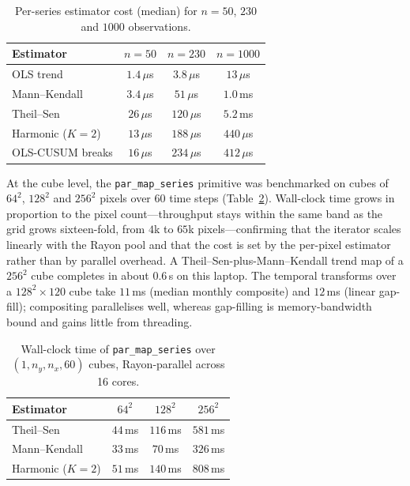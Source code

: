 \documentclass[review]{elsarticle}
\begin{document}
\begin{table}[t]
\centering
\caption{Per-series estimator cost (median) for $n = 50$, $230$ and $1000$
observations.}
\label{tab:perseries}
\small
\begin{tabular}{@{}lccc@{}}
\toprule
Estimator & $n{=}50$ & $n{=}230$ & $n{=}1000$ \\
\midrule
OLS trend            & $1.4\,\mu$s & $3.8\,\mu$s & $13\,\mu$s \\
Mann--Kendall        & $3.4\,\mu$s & $51\,\mu$s  & $1.0\,$ms \\
Theil--Sen           & $26\,\mu$s  & $120\,\mu$s & $5.2\,$ms \\
Harmonic ($K{=}2$)   & $13\,\mu$s  & $188\,\mu$s & $440\,\mu$s \\
OLS-CUSUM breaks     & $16\,\mu$s  & $234\,\mu$s & $412\,\mu$s \\
\bottomrule
\end{tabular}
\end{table}

At the cube level, the \texttt{par\_map\_series} primitive was benchmarked on
cubes of $64^2$, $128^2$ and $256^2$ pixels over $60$ time steps
(Table~\ref{tab:scaling}). Wall-clock time grows in proportion to the pixel
count---throughput stays within the same band as the grid grows sixteen-fold,
from $4$k to $65$k pixels---confirming that the iterator scales linearly with
the Rayon pool and that the cost is set by the per-pixel estimator rather than by
parallel overhead. A Theil--Sen-plus-Mann--Kendall trend map of a $256^2$ cube
completes in about $0.6$\,s on this laptop. The temporal transforms over a
$128^2\times120$ cube take $11$\,ms (median monthly composite) and $12$\,ms
(linear gap-fill); compositing parallelises well, whereas gap-filling is
memory-bandwidth bound and gains little from threading.

\begin{table}[t]
\centering
\caption{Wall-clock time of \texttt{par\_map\_series} over $(1, n_y, n_x, 60)$
cubes, Rayon-parallel across 16 cores.}
\label{tab:scaling}
\small
\begin{tabular}{@{}lccc@{}}
\toprule
Estimator & $64^2$ & $128^2$ & $256^2$ \\
\midrule
Theil--Sen     & $44\,$ms & $116\,$ms & $581\,$ms \\
Mann--Kendall  & $33\,$ms & $70\,$ms  & $326\,$ms \\
Harmonic ($K{=}2$) & $51\,$ms & $140\,$ms & $808\,$ms \\
\bottomrule
\end{tabular}
\end{table}
\end{document}
